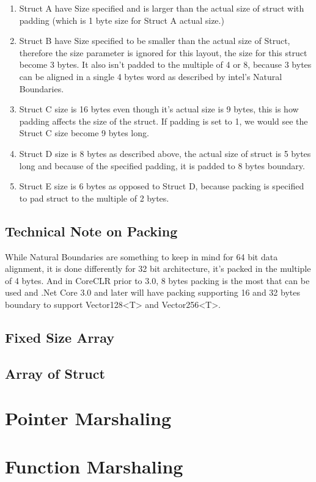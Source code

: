 \begin{enumerate}
	\item Struct A have Size specified and is larger than the actual size of struct with padding (which is 1 byte size for Struct A actual size.)
	\item Struct B have Size specified to be smaller than the actual size of Struct, therefore the size parameter is ignored for this layout, the size for this struct become 3 bytes. It also isn't padded to the multiple of 4 or 8, because 3 bytes can be aligned in a single 4 bytes word as described by intel's Natural Boundaries.
	\item Struct C size is 16 bytes even though it's actual size is 9 bytes, this is how padding affects the size of the struct. If padding is set to 1, we would see the Struct C size become 9 bytes long.
	\item Struct D size is 8 bytes as described above, the actual size of struct is 5 bytes long and because of the specified padding, it is padded to 8 bytes boundary.
	\item Struct E size is 6 bytes as opposed to Struct D, because packing is specified to pad struct to the multiple of 2 bytes.
\end{enumerate}

\subsection{Technical Note on Packing}
While Natural Boundaries are something to keep in mind for 64 bit data alignment, it is done differently for 32 bit architecture, it's packed in the multiple of 4 bytes. And in CoreCLR prior to 3.0, 8 bytes packing is the most that can be used and .Net Core 3.0 and later will have packing supporting 16 and 32 bytes boundary to support Vector128<T> and Vector256<T>. 

\subsection{Fixed Size Array}

\subsection{Array of Struct}

\section{Pointer Marshaling}

\section{Function Marshaling}


